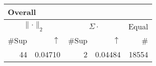 \begin{center}
\renewcommand{\tabcolsep}{4pt}
\renewcommand{\arraystretch}{1.1}
\begin{customnormal}
\begin{tabular}{rrrrr}
\multicolumn{5}{l}{Overall}\\
\toprule
\multicolumn{2}{c}{$\lVert \cdot \rVert_2$} & \multicolumn{2}{c}{$\Sigma \cdot$} & \multicolumn{1}{c}{Equal} \\ 
\cmidrule(lr){1-2} \cmidrule(lr){3-4} \cmidrule(lr){5-5}
\#Sup & $\uparrow$ & \#Sup & $\uparrow$ & \# \\ 
\midrule
44 & 0.04710  & 2 & 0.04484  & 18554 \\ 
\bottomrule
\end{tabular}


\end{customnormal}
\end{center}


